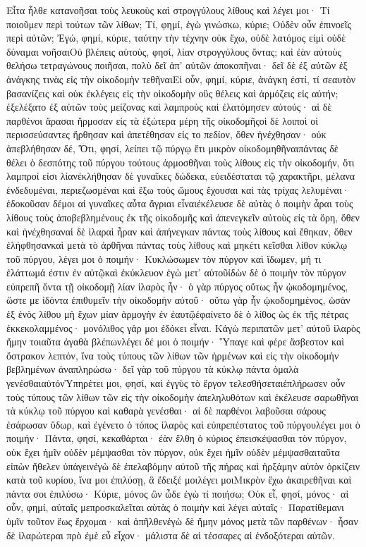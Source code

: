 Εἶτα ἦλθε κατανοῆσαι τοὺς λευκοὺς καὶ στρογγύλους λίθους καὶ λέγει μοι· Τί ποιοῦμεν περὶ τούτων τῶν λίθων; Τί, φημί, ἐγὼ γινώσκω, κύριε; Οὐδὲν οὖν ἐπινοεῖς περὶ αὐτῶν; Ἐγώ, φημί, κύριε, ταύτην τὴν τέχνην οὐκ ἔχω, οὐδὲ λατόμος εἰμὶ οὐδὲ δύναμαι νοῆσαιΟὐ βλέπεις αὐτοὺς, φησί, λίαν στρογγύλους ὄντας; καὶ ἐὰν αὐτοὺς θελήσω τετραγώνους ποιῆσαι, πολὺ δεῖ ἀπ’ αὐτῶν ἀποκοπῆναι· δεῖ δὲ ἐξ αὐτῶν ἐξ ἀνάγκης τινὰς εἰς τὴν οἰκοδομὴν τεθῆναιΕἰ οὖν, φημί, κύριε, ἀνάγκη ἐστί, τί σεαυτὸν βασανίζεις καὶ οὐκ ἐκλέγεις εἰς τὴν οἰκοδομὴν οὓς θέλεις καὶ ἁρμόζεις εἰς αὐτήν; ἐξελέξατο ἐξ αὐτῶν τοὺς μείζονας καὶ λαμπροὺς καὶ ἐλατόμησεν αὐτούς· αἱ δὲ παρθένοι ἄρασαι ἥρμοσαν εἰς τὰ ἐξώτερα μέρη τῆς οἰκοδομῆςοἱ δὲ λοιποὶ οἱ περισσεύσαντες ἤρθησαν καὶ ἀπετέθησαν εἰς το πεδίον, ὅθεν ἠνέχθησαν· οὐκ ἀπεβλήθησαν δέ, Ὅτι, φησί, λείπει τῷ πύργῳ ἔτι μικρὸν οἰκοδομηθῆναιπάντας δὲ θέλει ὁ δεσπότης τοῦ πύργου τούτους ἁρμοσθῆναι τοὺς λίθους εἰς τὴν οἰκοδομήν, ὅτι λαμπροί εἰσι λίανἐκλήθησαν δὲ γυναῖκες δώδεκα, εὐειδέσταται τῷ χαρακτῆρι, μέλανα ἐνδεδυμέναι, περιεζωσμέναι καὶ ἔξω τοὺς ὤμους ἔχουσαι καὶ τὰς τρίχας λελυμέναι· ἐδοκοῦσαν δέμοι αἱ γυναῖκες αὗτα ἄγριαι εἶναιἐκέλευσε δὲ αὐτὰς ὁ ποιμὴν ἆραι τοὺς λίθους τοὺς ἀποβεβλημένους ἐκ τῆς οἰκοδομῆς καὶ ἀπενεγκεῖν αὐτοὺς εἰς τὰ ὄρη, ὅθεν καὶ ἠνέχθησαναἱ δὲ ἱλαραὶ ἦραν καὶ ἀπήνεγκαν πάντας τοὺς λίθους καὶ ἔθηκαν, ὅθεν ἐλήφθησανκαὶ μετὰ τὸ ἀρθῆναι πάντας τοὺς λίθους καὶ μηκέτι κεῖσθαι λίθον κύκλῳ τοῦ πύργου, λέγει μοι ὁ ποιμήν· Κυκλώσωμεν τὸν πύργον καὶ ἴδωμεν, μή τι ἐλάττωμά ἐστιν ἐν αὐτῷκαὶ ἐκύκλευον ἐγὼ μετ’ αὐτοῦἰδὼν δὲ ὁ ποιμὴν τὸν πύργον εὐπρεπῆ ὄντα τῇ οἰκοδομῇ λίαν ἱλαρὸς ἦν· ὁ γὰρ πύργος οὕτως ἦν ᾠκοδομημένος, ὥστε με ἰδόντα ἐπιθυμεῖν τὴν οἰκοδομὴν αὐτοῦ· οὕτω γὰρ ἧν ᾠκοδομημένος, ὡσὰν ἐξ ἑνὸς λίθου μὴ ἔχων μίαν ἁρμογὴν ἐν ἑαυτῷἐφαίνετο δὲ ὁ λίθος ὡς ἐκ τῆς πέτρας ἐκκεκολαμμένος· μονόλιθος γάρ μοι ἐδόκει εἶναι.
Κἀγὼ περιπατῶν μετ’ αὐτοῦ ἱλαρὸς ἤμην τοιαῦτα ἀγαθὰ βλέπωνλέγει δέ μοι ὁ ποιμήν· Ὕπαγε καὶ φέρε ἄσβεστον καὶ ὄστρακον λεπτόν, ἵνα τοὺς τύπους τῶν λίθων τῶν ἠρμένων καὶ εἰς τὴν οἰκοδομὴν βεβλημένων ἀναπληρώσω· δεῖ γὰρ τοῦ πύργου τὰ κύκλῳ πάντα ὁμαλὰ γενέσθαιαὐτόνὙπηρέτει μοι, φησί, καὶ ἐγγὺς τὸ ἔργον τελεσθήσεταιἐπλήρωσεν οὖν τοὺς τύπους τῶν λίθων τῶν εἰς τὴν οἰκοδομὴν ἀπεληλυθότων καὶ ἐκέλευσε σαρωθῆναι τὰ κύκλῳ τοῦ πύργου καὶ καθαρὰ γενέσθαι· αἱ δὲ παρθένοι λαβοῦσαι σάρους ἐσάρωσαν ὕδωρ, καὶ ἐγένετο ὁ τόπος ἱλαρὸς καὶ εὐπρεπέστατος τοῦ πύργουλέγει μοι ὁ ποιμήν· Πάντα, φησί, κεκαθάρται· ἐὰν ἔλθη ὁ κύριος ἐπεισκέψασθαι τὸν πύργον, οὐκ ἔχει ἡμῖν οὐδὲν μέμψασθαι τὸν πύργον, οὐκ ἔχει ἡμῖν οὐδὲν μέμψασθαιταῦτα εἰπὼν ἤθελεν ὑπάγεινἐγὼ δὲ ἐπελαβόμην αὐτοῦ τῆς πήρας καὶ ἠρξάμην αὐτὸν ὁρκίζειν κατὰ τοῦ κυρίου, ἵνα μοι ἐπιλύσῃ, ἃ ἔδειξέ μοιλέγει μοιΜικρὸν ἔχω ἀκαιρεθῆναι καὶ πάντα σοι ἐπιλύσω· Κύριε, μόνος ὢν ὧδε ἐγὼ τί ποιήσω; Οὐκ εἶ, φησί, μόνος· αἱ οὖν, φημί, αὐταῖς μεπροσκαλεῖται αὐτὰς ὁ ποιμὴν καὶ λέγει αὐταῖς· Παρατίθεμανι ὑμῖν τοῦτον ἕως ἔρχομαι· καὶ ἀπῆλθενἐγὼ δὲ ἤμην μόνος μετὰ τῶν παρθένων· ἦσαν δὲ ἱλαρώτεραι πρὸ ἐμὲ εὖ εἶχον· μάλιστα δὲ αἱ τέσσαρες αἱ ἐνδοξότεραι αὐτῶν.

